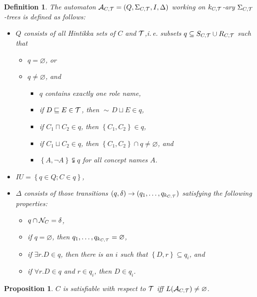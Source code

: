 \documentclass[openany]{scrbook}
\theoremstyle{break}
\newtheorem{Definition}[Theorem]{Definition}
\newtheorem{Proposition}[Theorem]{Proposition}
\theoremstyle{nonumberbreak}
\theoremstyle{nonumberplain}
\theoremstyle{nonumberbreak}
\newcommand{\set}[1]{\left\{#1\right\}}
\newcommand{\ie}{i{.}\,e{.}\xspace}
\newcommand{\nnf}{\mathop{\sim\!}}
\begin{document}
\begin{Definition}
  \label{5.8}
  The automaton ${\cal A}_{C, {\cal T}} = (Q, \Sigma_{C, {\cal T}}, I,
  \Delta)$ working on $k_{C, {\cal T}}$-ary $\Sigma_{C, {\cal
      T}}$-trees is defined as follows:
  \begin{itemize}
  \item $Q$ consists of all Hintikka sets of $C$ and ${\cal T}$,\ie
    subsets $q \subseteq S_{C, {\cal T}} \cup R_{C, {\cal T}}$ such
    that
    \begin{itemize}
    \item $q = \varnothing$, or
    \item $q \ne \varnothing$, and
      \begin{itemize}
      \item $q$ contains exactly one role name,
      \item if $D \sqsubseteq E \in {\cal T}$, then $\nnf D \sqcup E
        \in q$,
      \item if $C_1 \sqcap C_2 \in q$, then $\set{C_1, C_2} \in q$,
      \item if $C_1 \sqcup C_2 \in q$, then $\set{C_1, C_2} \cap q \ne
        \varnothing$, and
      \item $\set{A, \neg A} \subsetneqq q$ for all concept names $A$.
      \end{itemize}
    \end{itemize}
  \item $IU = \set{q \in Q; C \in q}$,
  \item $\Delta$ consists of those transitions $(q, \delta) \to (q_1,
    \dotsc, q_{k_{C, {\cal T}}})$ satisfying the following properties:
    \begin{itemize}
    \item $q \cap {\cal N}_C = \delta$,
    \item if $q = \varnothing$, then $q_1, \dotsc, q_{k_{C, {\cal T}}}
      = \varnothing$,
    \item if $\exists r.D \in q$, then there is an $i$ such that
      $\set{D, r} \subseteq q_i$, and
    \item if $\forall r.D \in q$ and $r \in q_i$, then $D \in q_i$.
    \end{itemize}
  \end{itemize}
\end{Definition}

\begin{Proposition}
  \label{5.9}
  $C$ is satisfiable with respect to ${\cal T}$ iff $L({\cal A}_{C,
    {\cal T}}) \ne \varnothing$.
\end{Proposition}
\end{document}
